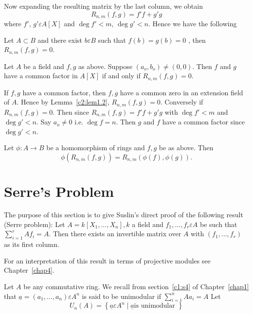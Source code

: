 Now expanding the resulting matrix by the last column, we obtain
$$
R_{n,m}(f,g)=f'f+g'g
$$
where $f'$, $g'\varepsilon A[X]$ and $\deg f'<m$, $\deg g'<n$. Hence
we have the following

\begin{lem}\label{c2:lem1.2}
Let $A \subset B$ and there exist $b\varepsilon B$ such that
$f(b)=g(b)=0$ , then $R_{n,m}(f,g)=0$.
\end{lem}

\begin{Prop}\label{c2:Prop1.3}
Let $A$ be a field and $f,g$ as above. Suppose $(a_o,b_o)\neq
(0,0)$. Then $f$ and $g$ have a common factor in $A[X]$ if and only if $R_{n,m}(f,g)=0$.
\end{Prop}

\begin{Proof}
If $f,g$ have a common factor, then $f,g$ have a common zero in an
extension field of $A$. Hence by Lemma~\ref{c2:lem1.2},
$R_{n,m}(f,g)=0$. Conversely if $R_{n,m}(f,g)=0$. Then since
$R_{n,m}(f,g)=f'f+g'g$ with $\deg f'<m$  and $\deg g' <n$. Say
$a_o\neq 0$ i.e. $\deg f=n$. Then $g$ and $f$ have a common factor
since $\deg g' <n$.
\enprf
\end{Proof}

\begin{rem}\label{c2:rem1.4}
Let $\phi:A\rightarrow B$ be a homomorphism of rings and $f,g$ be as
above. Then 
$$
\phi(R_{n,m}(f,g))=R_{n,m}(\phi(f), \phi(g)).
$$
\end{rem}

\section{Serre's Problem}\label{c2:s2}

The purpose of this section is to give Suslin's direct proof of the
following result
(Serre problem): Let $A=k[X_1,\ldots,X_n], k$ a field and
$f_1,\ldots,f_r \varepsilon A$ be such that
$\sum\limits_{i=1}^{r}Af_i=A$. Then there exists an invertible matrix
over $A$ with $(f_1,\ldots,f_r)$ as its first column.

For an interpretation of this result in terms of projective modules
see Chapter~\ref{chap4}.

Let $A$ be any commutative ring. We recall from section~\ref{c1:s4} of
Chapter~\ref{chap1} that $\underline{a}=(a_1,\ldots,a_n) \varepsilon
A^{n}$ is said to be unimodular if $\sum\limits_{i=1}^{n}Aa_i=A$ Let 
$$
U_n(A)=\left\{\underline{a} \varepsilon A^{n}\mid \underline{a} \text{
  is unimodular }\right\}
$$

